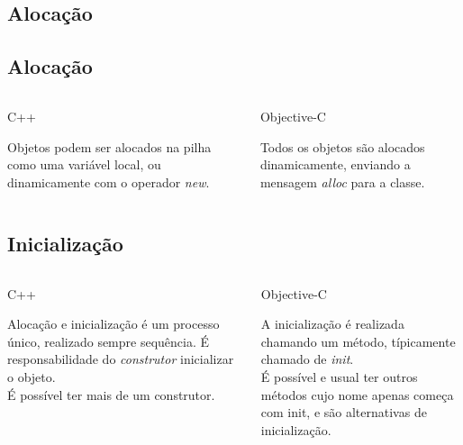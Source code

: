 \documentclass[brazil]{beamer}
\begin{document}
\subsection{Alocação}

\subsection{Alocação}
\begin{frame}
  \begin{columns}
    \begin{column}{.5\textwidth}
        \begin{center}
            C++
        \end{center}
        Objetos podem ser alocados na pilha como uma variável local, ou dinamicamente com o operador \textit{new}.
    \end{column}
    \begin{column}{.5\textwidth}
        \begin{center}
            Objective-C
        \end{center}
        Todos os objetos são alocados dinamicamente, enviando a mensagem \textit{alloc} para a classe.
    \end{column}
  \end{columns}
\end{frame}

\subsection{Inicialização}
\begin{frame}
  \begin{columns}
    \begin{column}{.5\textwidth}
        \begin{center}
            C++
        \end{center}
        Alocação e inicialização é um processo único, realizado sempre sequência. 
        É responsabilidade do \textit{construtor} inicializar o objeto. \\
        É possível ter mais de um construtor.
    \end{column}
    \begin{column}{.5\textwidth}
        \begin{center}
            Objective-C
        \end{center}
        A inicialização é realizada chamando um método, típicamente chamado de \textit{init}. \\
        É possível e usual ter outros métodos cujo nome apenas começa com init, e são alternativas de inicialização.
    \end{column}
  \end{columns}
\end{frame}
\end{document}
